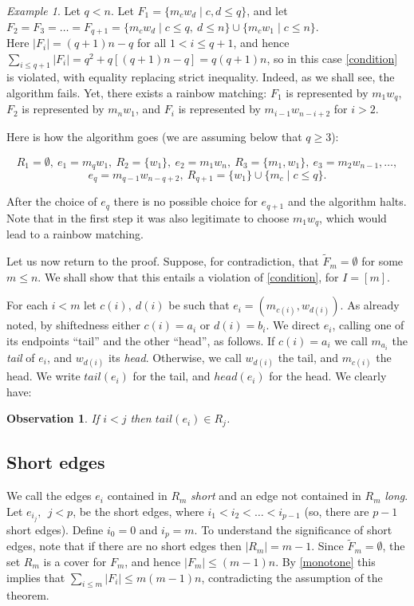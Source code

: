 \documentclass{amsart}
\newtheorem{observation}[theorem]{Observation}
\theoremstyle{remark}
\newtheorem{example}[theorem]{Example}
\newcommand{\eij}{e_{i_j}}
\begin{document}
\begin{example}\label{stealexample} Let $q<n$. Let
$F_1=\{m_cw_d \mid c,d \le q\}$, and let $F_2=F_3= \ldots= F_{q+1}=\{m_cw_d \mid c\le q,~d \le n\} \cup \{m_cw_1 \mid c \le n\}$.
\\
Here $|F_i|=(q+1)n-q$ for all $1<i\le q+1$, and hence $\sum_{i\le {q+1}}|F_i|=q^2+q[(q+1)n-q]=q(q+1)n$, so in this case \eqref{condition} is violated, with equality replacing strict inequality. Indeed, as we shall see, the algorithm fails. Yet, there exists a rainbow matching: $F_1$ is represented by $m_1w_q$, $F_2$ is represented by $m_nw_1$, and  $F_i$ is represented by $m_{i-1}w_{n-i+2}$ for $i>2$.

 Here is how the algorithm goes (we are assuming below that $q\ge 3$):

$$R_1=\emptyset,~e_1=m_qw_1,~R_2=\{w_1\},~e_2=m_1w_n,~R_3=\{m_1,w_1\}, ~e_3=m_2w_{n-1}, \ldots, $$ $$e_q=m_{q-1}w_{n-q+2},~R_{q+1}=\{w_1\} \cup \{m_c \mid c\le q\}.$$

After the choice of $e_q$ there is no possible choice for $e_{q+1}$ and the algorithm halts. Note that in the first step it was also legitimate  to choose $m_1w_q$, which would lead to a rainbow matching.\\

\end{example}



Let us now return to the proof. Suppose, for contradiction, that $\tilde{F}_m = \emptyset$ for some
$m  \le n$. We shall show that this entails a violation of \eqref{condition}, for $I=[m]$.



For each $i <m$ let $c(i),~d(i)$ be such that  $e_i
=(m_{c(i)},w_{d(i)})$. As already noted, by shiftedness either
$c(i)=a_i$ or $d(i)=b_i$. We direct $e_i$, calling one of its
endpoints ``tail'' and the other ``head'', as follows. If $c(i)=a_i$
we call $m_{a_i}$ the {\em tail} of $e_i$, and $w_{d(i)}$ its {\em
head}. Otherwise, we call $w_{d(i)}$ the tail, and $m_{c(i)}$ the
head. We write $tail(e_i)$ for the tail, and $head(e_i)$ for the
head. We clearly have:
\begin{observation}\label{tail}
If $i<j$ then $tail(e_i) \in R_j$.

\end{observation}


\subsection{Short edges}
We call the edges $e_i$ contained in $R_m$ {\em short} and an edge
not contained in $R_m$ {\em long}. Let $\eij, ~~j <p$, be the short
edges, where $i_1<i_2<\ldots< i_{p-1}$ (so, there are $p-1$ short
edges). Define $i_0=0$ and $i_p=m$. To understand the significance
of short edges, note that if there are no short edges
 then $|R_m|=m-1$. Since
$\tilde{F}_m =\emptyset$,   the set $R_m$ is a cover for $F_m$, and hence
 $|F_m| \le (m-1)n$. By \eqref{monotone} this implies that $\sum_{i \le m}|F_i|
\le m(m-1)n$, contradicting the assumption of the theorem.\\
\end{document}
